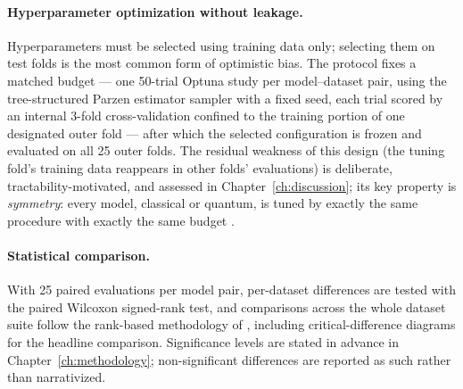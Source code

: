 \paragraph{Hyperparameter optimization without leakage.}
Hyperparameters must be selected using training data only; selecting them on
test folds is the most common form of optimistic bias. The protocol fixes a
matched budget --- one 50-trial Optuna study \citep{akiba2019optuna} per
model--dataset pair, using the tree-structured Parzen estimator sampler with a
fixed seed, each trial scored by an internal 3-fold cross-validation confined
to the training portion of one designated outer fold --- after which the
selected configuration is frozen and evaluated on all 25 outer folds. The
residual weakness of this design (the tuning fold's training data reappears in
other folds' evaluations) is deliberate, tractability-motivated, and assessed
in Chapter~\ref{ch:discussion}; its key property is \emph{symmetry}: every
model, classical or quantum, is tuned by exactly the same procedure with
exactly the same budget \citep{bowles2024better}.

\paragraph{Statistical comparison.}
With 25 paired evaluations per model pair, per-dataset differences are tested
with the paired Wilcoxon signed-rank test, and comparisons across the whole
dataset suite follow the rank-based methodology of \citet{demsar2006comparisons},
including critical-difference diagrams for the headline comparison.
Significance levels are stated in advance in Chapter~\ref{ch:methodology};
non-significant differences are reported as such rather than narrativized.
